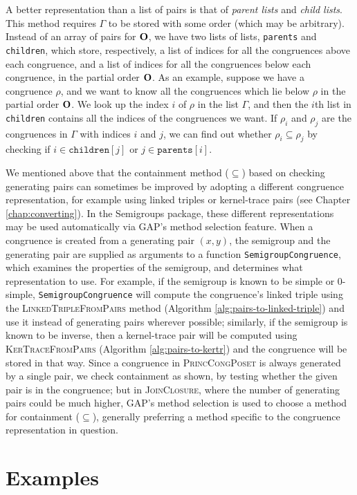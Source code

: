 A better representation than a list of pairs is that of \textit{parent lists}
and \textit{child lists}.  This method requires $\Gamma$ to be stored with some
order (which may be arbitrary).  Instead of an array of pairs for $\mathbf{O}$, we have
two lists of lists, \texttt{parents} and \texttt{children}, which store,
respectively, a list of indices for all the congruences above each congruence,
and a list of indices for all the congruences below each congruence, in the
partial order $\mathbf{O}$.  As an example, suppose we have a congruence $\rho$, and we
want to know all the congruences which lie below $\rho$ in the partial order
$\mathbf{O}$.  We look up the index $i$ of $\rho$ in the list $\Gamma$, and then the
$i$th list in \texttt{children} contains all the indices of the congruences we
want.  If $\rho_i$ and $\rho_j$ are the congruences in $\Gamma$ with indices $i$
and $j$, we can find out whether $\rho_i \subseteq \rho_j$ by checking if
$i \in \mathtt{children}[j]$ or $j \in \mathtt{parents}[i]$.

We mentioned above that the containment method ($\subseteq$) based on checking
generating pairs can sometimes be improved by adopting a different congruence
representation, for example using linked triples or kernel-trace pairs (see
Chapter \ref{chap:converting}).  In the Semigroups package, these different
representations may be used automatically via GAP's method selection feature.
When a congruence is created from a generating pair $(x,y)$, the semigroup and
the generating pair are supplied as arguments to a function
\texttt{SemigroupCongruence}, which examines the properties of the semigroup,
and determines what representation to use.  For example, if the semigroup is
known to be simple or 0-simple, \texttt{SemigroupCongruence} will compute the
congruence's linked triple using the \textsc{LinkedTripleFromPairs} method
(Algorithm \ref{alg:pairs-to-linked-triple}) and use it instead of generating
pairs wherever possible; similarly, if the semigroup is known to be inverse,
then a kernel-trace pair will be computed using \textsc{KerTraceFromPairs}
(Algorithm \ref{alg:pairs-to-kertr}) and the congruence will be stored in that
way.  Since a congruence in \textsc{PrincCongPoset} is always generated by a
single pair, we check containment as shown, by testing whether the given pair is
in the congruence; but in \textsc{JoinClosure}, where the number of generating
pairs could be much higher, GAP's method selection is used to choose a method
for containment ($\subseteq$), generally preferring a method specific to the
congruence representation in question.

\section{Examples}
\label{sec:lattice-examples}
